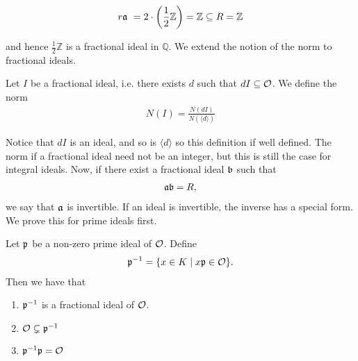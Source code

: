     \begin{align*}
        r\mathfrak{a}\ = 2\cdot\left(\frac{1}{2}\mathbb{Z}\right) = \mathbb{Z} \subseteq R = \mathbb{Z}
    \end{align*}
    
    and hence \(\frac{1}{2}\mathbb{Z}\) is a fractional ideal in \(\mathbb{Q}\). We extend the notion of the norm to fractional ideals.
    \begin{definition}
    Let \(I\) be a fractional ideal, i.e. there exists \(d\) such that \(dI\subseteq\mathcal{O}\). We define the norm
    \begin{align*}
        N(I) = \frac{N(dI)}{N(\langle d\rangle)}
    \end{align*}
    \end{definition}
    Notice that \(dI\) is an ideal, and so is \(\langle d \rangle\) so this definition if well defined. The norm if a fractional ideal need not be an integer, but this is still the case for integral ideals. Now, if there exist a fractional ideal \(\mathfrak{b}\) such that 
    \begin{align*}
        \mathfrak{a}\mathfrak{b} = R,
    \end{align*}
    we say that \(\mathfrak{a}\) is invertible. If an ideal is invertible, the inverse has a special form. We prove this for prime ideals first.
    \begin{proposition}
    \label{Prop: Invertible Prime Ideal}
        Let \(\mathfrak{p}\) be a non-zero prime ideal of \(\mathcal{O}\). Define
        \begin{align*}
            \mathfrak{p}^{-1} = \{x\in K\;|\; x\mathfrak{p}\in\mathcal{O}\}.
        \end{align*}
        Then we have that
        \begin{enumerate}
            \item \(\mathfrak{p}^{-1}\) is a fractional ideal of \(\mathcal{O}\).
            \item \(\mathcal{O}\subsetneq\mathfrak{p}^{-1}\)
            \item \(\mathfrak{p}^{-1}\mathfrak{p} = \mathcal{O}\)
        \end{enumerate}
    \end{proposition}
